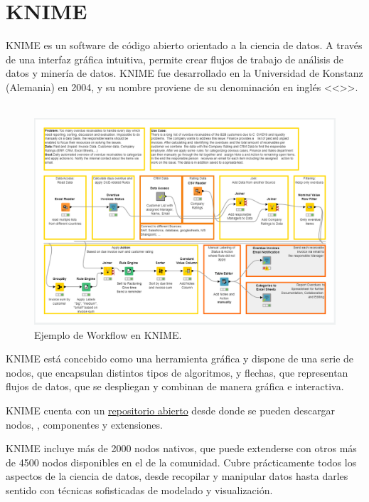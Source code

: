 
\section{KNIME}

KNIME es un software de código abierto orientado a la ciencia de datos. A través de una interfaz gráfica intuitiva, 
permite crear flujos de trabajo de análisis de datos y minería de datos. KNIME fue desarrollado en la Universidad de 
Konstanz (Alemania) en 2004, y su nombre proviene de su denominación en inglés <<>>\cite{knime-whitepaper}. 
\

\begin{figure}[!h]
	\centering
	\includegraphics[width=1\textwidth]{img/3_ejemplo_workflow_knime.png}
	\caption{Ejemplo de Workflow en KNIME.}
	\label{fig:ejemploworkflow}
\end{figure}
\FloatBarrier

KNIME está concebido como una herramienta gráfica y dispone de una serie de nodos, que encapsulan distintos tipos de
 algoritmos, y flechas, que representan flujos de datos, que se despliegan y combinan de manera gráfica e interactiva.
\

KNIME cuenta con un \href{https://hub.knime.com/}{repositorio abierto} desde donde se pueden descargar nodos, , componentes y extensiones. 
\

KNIME incluye más de 2000 nodos nativos, que puede extenderse con otros más de 4500 nodos disponibles en el  
de la comunidad. Cubre prácticamente todos los aspectos de la ciencia de datos, desde recopilar y manipular 
datos hasta darles sentido con técnicas sofisticadas de modelado y visualización.
\

